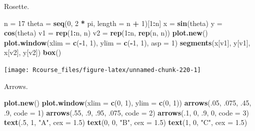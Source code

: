 \documentclass[]{book}
\newenvironment{Shaded}{\begin{snugshade}}{\end{snugshade}}
\newcommand{\KeywordTok}[1]{\textcolor[rgb]{0.13,0.29,0.53}{\textbf{#1}}}
\newcommand{\DataTypeTok}[1]{\textcolor[rgb]{0.13,0.29,0.53}{#1}}
\newcommand{\DecValTok}[1]{\textcolor[rgb]{0.00,0.00,0.81}{#1}}
\newcommand{\FloatTok}[1]{\textcolor[rgb]{0.00,0.00,0.81}{#1}}
\newcommand{\StringTok}[1]{\textcolor[rgb]{0.31,0.60,0.02}{#1}}
\newcommand{\OperatorTok}[1]{\textcolor[rgb]{0.81,0.36,0.00}{\textbf{#1}}}
\newcommand{\NormalTok}[1]{#1}
\theoremstyle{definition}
\theoremstyle{definition}
\theoremstyle{definition}
\theoremstyle{remark}
\begin{document}
Rosette.

\begin{Shaded}
\begin{Highlighting}[]
\NormalTok{n =}\StringTok{ }\DecValTok{17}
\NormalTok{theta =}\StringTok{ }\KeywordTok{seq}\NormalTok{(}\DecValTok{0}\NormalTok{, }\DecValTok{2} \OperatorTok{*}\StringTok{ }\NormalTok{pi, }\DataTypeTok{length =}\NormalTok{ n }\OperatorTok{+}\StringTok{ }\DecValTok{1}\NormalTok{)[}\DecValTok{1}\OperatorTok{:}\NormalTok{n]}
\NormalTok{x =}\StringTok{ }\KeywordTok{sin}\NormalTok{(theta)}
\NormalTok{y =}\StringTok{ }\KeywordTok{cos}\NormalTok{(theta)}
\NormalTok{v1 =}\StringTok{ }\KeywordTok{rep}\NormalTok{(}\DecValTok{1}\OperatorTok{:}\NormalTok{n, n)}
\NormalTok{v2 =}\StringTok{ }\KeywordTok{rep}\NormalTok{(}\DecValTok{1}\OperatorTok{:}\NormalTok{n, }\KeywordTok{rep}\NormalTok{(n, n))}
\KeywordTok{plot.new}\NormalTok{()}
\KeywordTok{plot.window}\NormalTok{(}\DataTypeTok{xlim =} \KeywordTok{c}\NormalTok{(}\OperatorTok{-}\DecValTok{1}\NormalTok{, }\DecValTok{1}\NormalTok{), }\DataTypeTok{ylim =} \KeywordTok{c}\NormalTok{(}\OperatorTok{-}\DecValTok{1}\NormalTok{, }\DecValTok{1}\NormalTok{), }\DataTypeTok{asp =} \DecValTok{1}\NormalTok{)}
\KeywordTok{segments}\NormalTok{(x[v1], y[v1], x[v2], y[v2])}
\KeywordTok{box}\NormalTok{()}
\end{Highlighting}
\end{Shaded}

\texttt{[image: Rcourse\_files/figure-latex/unnamed-chunk-220-1]}

Arrows.

\begin{Shaded}
\begin{Highlighting}[]
\KeywordTok{plot.new}\NormalTok{()}
\KeywordTok{plot.window}\NormalTok{(}\DataTypeTok{xlim =} \KeywordTok{c}\NormalTok{(}\DecValTok{0}\NormalTok{, }\DecValTok{1}\NormalTok{), }\DataTypeTok{ylim =} \KeywordTok{c}\NormalTok{(}\DecValTok{0}\NormalTok{, }\DecValTok{1}\NormalTok{))}
\KeywordTok{arrows}\NormalTok{(.}\DecValTok{05}\NormalTok{, .}\DecValTok{075}\NormalTok{, .}\DecValTok{45}\NormalTok{, .}\DecValTok{9}\NormalTok{, }\DataTypeTok{code =} \DecValTok{1}\NormalTok{)}
\KeywordTok{arrows}\NormalTok{(.}\DecValTok{55}\NormalTok{, .}\DecValTok{9}\NormalTok{, .}\DecValTok{95}\NormalTok{, .}\DecValTok{075}\NormalTok{, }\DataTypeTok{code =} \DecValTok{2}\NormalTok{)}
\KeywordTok{arrows}\NormalTok{(.}\DecValTok{1}\NormalTok{, }\DecValTok{0}\NormalTok{, .}\DecValTok{9}\NormalTok{, }\DecValTok{0}\NormalTok{, }\DataTypeTok{code =} \DecValTok{3}\NormalTok{)}
\KeywordTok{text}\NormalTok{(.}\DecValTok{5}\NormalTok{, }\DecValTok{1}\NormalTok{, }\StringTok{"A"}\NormalTok{, }\DataTypeTok{cex =} \FloatTok{1.5}\NormalTok{)}
\KeywordTok{text}\NormalTok{(}\DecValTok{0}\NormalTok{, }\DecValTok{0}\NormalTok{, }\StringTok{"B"}\NormalTok{, }\DataTypeTok{cex =} \FloatTok{1.5}\NormalTok{)}
\KeywordTok{text}\NormalTok{(}\DecValTok{1}\NormalTok{, }\DecValTok{0}\NormalTok{, }\StringTok{"C"}\NormalTok{, }\DataTypeTok{cex =} \FloatTok{1.5}\NormalTok{)}
\end{Highlighting}
\end{Shaded}
\end{document}
